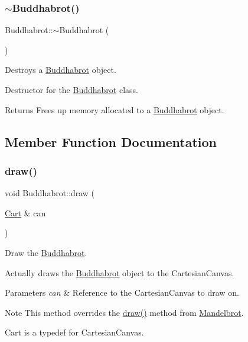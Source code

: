 \subsubsection{\texorpdfstring{$\sim$\+Buddhabrot()}{~Buddhabrot()}}
{\footnotesize\ttfamily Buddhabrot\+::$\sim$\+Buddhabrot (\begin{DoxyParamCaption}{ }\end{DoxyParamCaption})}



Destroys a \hyperlink{class_buddhabrot}{Buddhabrot} object. 

Destructor for the \hyperlink{class_buddhabrot}{Buddhabrot} class. \begin{DoxyReturn}{Returns}
Frees up memory allocated to a \hyperlink{class_buddhabrot}{Buddhabrot} object. 
\end{DoxyReturn}


\subsection{Member Function Documentation}
\mbox{\label{class_buddhabrot_a9e65eb7e2cac8737aedec56a7e2c274c}} 
\subsubsection{\texorpdfstring{draw()}{draw()}}
{\footnotesize\ttfamily void Buddhabrot\+::draw (\begin{DoxyParamCaption}\item[{\hyperlink{classtsgl_1_1_cartesian_canvas}{Cart} \&}]{can }\end{DoxyParamCaption})\hspace{0.3cm}{\ttfamily [virtual]}}



Draw the \hyperlink{class_buddhabrot}{Buddhabrot}. 

Actually draws the \hyperlink{class_buddhabrot}{Buddhabrot} object to the Cartesian\+Canvas. 
\begin{DoxyParams}{Parameters}
{\em can} & Reference to the Cartesian\+Canvas to draw on. \\
\hline
\end{DoxyParams}
\begin{DoxyNote}{Note}
This method overrides the \hyperlink{class_buddhabrot_a9e65eb7e2cac8737aedec56a7e2c274c}{draw()} method from \hyperlink{class_mandelbrot}{Mandelbrot}. 

Cart is a typedef for Cartesian\+Canvas. 
\end{DoxyNote}


